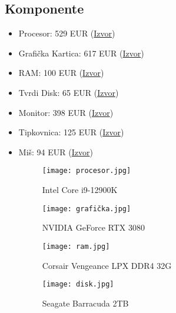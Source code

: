 \documentclass{article}
\begin{document}
\subsection*{Komponente}
\begin{itemize}
 \item Procesor: 529 EUR (\href{https://www.instar-informatika.hr/procesor-intel-core-i9-12900k-52ghz-30mb-lga1700-bx8071512900k/110276/product/}{Izvor})
\item Grafička Kartica: 617 EUR (\href{https://www.amazon.com/MSI-3080-GPU-RTX-10G-LHR/dp/B09P6SZT74}{Izvor})
\item RAM: 100 EUR (\href{https://www.instar-informatika.hr/memorija-corsair-vengeance-lpx-32gb-2x16gb-ddr4-3200mhz-cl16/105658/product/}{Izvor})
\item Tvrdi Disk: 65 EUR (\href{https://www.hgspot.hr/tvrdi-disk-2-tb-seagate-barracuda-3-5-sata-iii-7200-rpm-256-mb-st2000dm008}{Izvor})
\item Monitor: 398 EUR (\href{https://www.mikronis.hr/Proizvod/monitor-dell-u2719d-27-led-ips-2560x1440-10001-350cd-m2-8ms-p-n-u2719d/1937}{Izvor})
\item Tipkovnica: 125 EUR (\href{https://laptopi.hr/informatika/periferija/tipkovnice/tipkovnica-logitech-mx-keys-advanced-wireless-crna-qwerty-spanjolska-siva-grafit-qwerty-detail?utm_source=nabava.net&utm_campaign=nabava.net&utm_medium=click}{Izvor})
\item Miš: 94 EUR (\href{https://iponcomp.hr/shop/proizvod/logitech-mx-master-3-crno/1812744?utm_source=nabava.net&utm_campaign=nabava.net&utm_medium=click}{Izvor})

\begin{figure}[htbp]
  \centering
  \texttt{[image: procesor.jpg]}
  \caption{Intel Core i9-12900K}
\end{figure}

\begin{figure}[htbp]
  \centering
  \texttt{[image: grafička.jpg]}
  \caption{NVIDIA GeForce RTX 3080}
\end{figure}

\begin{figure}[htbp]
  \centering
  \texttt{[image: ram.jpg]}
  \caption{Corsair Vengeance LPX DDR4 32G}
\end{figure}

\begin{figure}[htbp]
  \centering
  \texttt{[image: disk.jpg]}
  \caption{Seagate Barracuda 2TB}
\end{figure}


\end{itemize}
\end{document}
